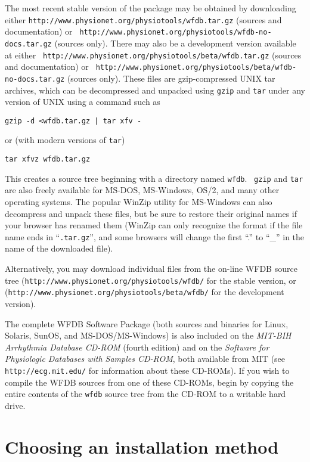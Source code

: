 The most recent stable version of the package may be obtained by downloading
either {\tt http://www.\-physio\-net.\-org/\-physio\-tools/\-wfdb.tar.gz}
(sources and documentation) or {\tt
http://www.\-physio\-net.\-org/\-physio\-tools/\-wfdb-no-docs.tar.gz}
(sources only).
There may also be a development version available at either {\tt
http://www.\-physio\-net.\-org/\-physio\-tools/\-beta/\-wfdb.tar.gz}
(sources and documentation) or {\tt
http://www.\-physio\-net.\-org/\-physio\-tools/\-beta/\-wfdb-no-docs.tar.gz}
(sources only).
These files are gzip-compressed UNIX tar archives, which can be decompressed
and unpacked using {\tt gzip} and {\tt tar} under any version of UNIX using
a command such as
\begin{verbatim}
gzip -d <wfdb.tar.gz | tar xfv -
\end{verbatim}
or (with modern versions of {\tt tar})
\begin{verbatim}
tar xfvz wfdb.tar.gz
\end{verbatim}
This creates a source tree beginning with a directory named {\tt wfdb}.  {\tt
gzip} and {\tt tar} are also freely available for MS-DOS, MS-Windows, OS/2,
and many other operating systems.  The popular WinZip utility for MS-Windows
can also decompress and unpack these files, but be sure to restore their
original names if your browser has renamed them (WinZip can only recognize the
format if the file name ends in ``{\tt .tar.gz}'', and some browsers will
change the first ``.'' to ``\_'' in the name of the downloaded file).

Alternatively, you may download individual files from the on-line WFDB source
tree ({\tt http://www.\-physio\-net.\-org/\-physio\-tools/\-wfdb/} for
the stable version,
or ({\tt http://www.\-physio\-net\-.org/\-physio\-tools/\-beta/\-wfdb/} for
the development version).

The complete WFDB Software Package (both sources and binaries for
Linux, Solaris, SunOS, and MS-DOS/MS-Windows) is also included on
the {\it MIT-BIH Arrhythmia Database CD-ROM} (fourth edition) and on the
{\it Software for Physiologic Databases with Samples CD-ROM}, both
available from MIT (see {\tt http://ecg.mit.edu/} for information
about these CD-ROMs).  If you wish to compile the WFDB sources from one of
these CD-ROMs, begin by copying the entire contents of the {\tt wfdb} source
tree from the CD-ROM to a writable hard drive.

\section*{Choosing an installation method}

